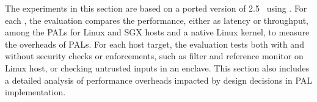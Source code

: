 The experiments in this section are based on a ported version of \lmbench{} 2.5~\cite{McVoy:lmbench} using \thehostabi{}.
For each \hostapi{}, the evaluation %
compares the performance, either as latency or throughput, among the PALs for Linux and SGX hosts
and a native Linux kernel,
to measure the overheads of PALs.
For each host target,
the evaluation tests both with and without security checks or enforcements,
such as \seccomp{} filter and reference monitor on Linux host,
or checking untrusted inputs in an enclave.
This section also includes a detailed analysis
of performance overheads
impacted by design decisions in PAL implementation. 



















